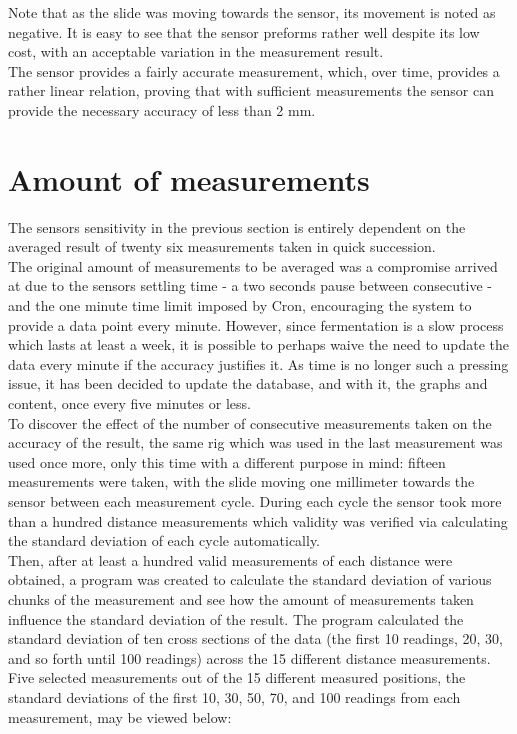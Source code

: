 \documentclass[twoside]{ctuthesis}
\theoremstyle{plain}
\theoremstyle{definition}
\theoremstyle{note}
\begin{document}
Note that as the slide was moving towards the sensor, its movement is noted as negative.
It is easy to see that the sensor preforms rather well despite its low cost, with an acceptable variation in the measurement result.\\
The sensor provides a fairly accurate measurement, which, over time, provides a rather linear relation, proving that with sufficient measurements the sensor can provide the necessary accuracy of less than 2 mm.

\section{Amount of measurements}
The sensors sensitivity in the previous section is entirely dependent on the averaged result of twenty six measurements taken in quick succession.\\
The original amount of measurements to be averaged was a compromise arrived at due to the sensors settling time - a two seconds pause between consecutive - and the one minute time limit imposed by Cron, encouraging the system to provide a data point every minute. However, since fermentation is a slow process which lasts at least a week\cite{Joy_Of_Brewing}, it is possible to perhaps waive the need to update the data every minute if the accuracy justifies it. As time is no longer such a pressing issue, it has been decided to update the database, and with it, the graphs and content, once every five minutes or less.\\
To discover the effect of the number of consecutive measurements taken on the accuracy of the result, the same rig which was used in the last measurement was used once more, only this time with a different purpose in mind: fifteen measurements were taken, with the slide moving one millimeter towards the sensor between each measurement cycle. During each cycle the sensor took more than a hundred distance measurements which validity was verified via calculating the standard deviation of each cycle automatically.\\
Then, after at least a hundred valid measurements of each distance were obtained, a program was created to calculate the standard deviation of various chunks of the measurement and see how the amount of measurements taken influence the standard deviation of the result. The program calculated the standard deviation of ten cross sections of the data (the first 10 readings, 20, 30, and so forth until 100 readings) across the 15 different distance measurements.\\
Five selected measurements out of the 15 different measured positions, the standard deviations of the first 10, 30, 50, 70, and 100 readings from each measurement, may be viewed below:
\end{document}

